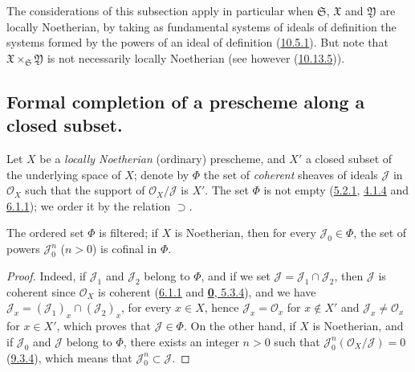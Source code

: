 \begin{env}[10.7.4]
The considerations of this subsection apply in particular when
$\mathfrak{S}$, $\mathfrak{X}$ and $\mathfrak{Y}$ are locally
Noetherian, by taking as fundamental systems of ideals of definition
the systems formed by the powers of an ideal of definition
(\hyperref[I.10.5.1]{10.5.1}). But note that
$\mathfrak{X}\times_{\mathfrak{S}}\mathfrak{Y}$ is not necessarily
locally Noetherian (see however
(\hyperref[I.10.13.5]{10.13.5})).
\end{env}


\subsection{Formal completion of a prescheme along a closed subset.}
\label{subsection:I.10.8}

\begin{env}[10.8.1]
\label{I.10.8.1}
Let $X$ be a \emph{locally Noetherian} (ordinary) prescheme, and $X'$ a closed
subset of the underlying space of $X$; denote by $\Phi$ the set of
\emph{coherent} sheaves of ideals $\mathscr{J}$ in $\mathscr{O}_X$ such that
the support of $\mathscr{O}_X/\mathscr{J}$ is $X'$. The set $\Phi$
is not empty (\hyperref[I.5.2.1]{5.2.1},
\hyperref[I.4.1.4]{4.1.4} and
\hyperref[I.6.1.1]{6.1.1}); we order it by the relation
$\supset$.
\end{env}

\begin{lemma}[10.8.2]
\label{I.10.8.2}
The ordered set $\Phi$ is filtered; if $X$ is Noetherian, then for every
$\mathscr{J}_0\in\Phi$, the set of powers
$\mathscr{J}_0^n$ ($n>0$) is cofinal in $\Phi$.
\end{lemma}

\begin{proof}
Indeed, if $\mathscr{J}_1$ and $\mathscr{J}_2$ belong to $\Phi$, and
if we set $\mathscr{J}=\mathscr{J}_1\cap\mathscr{J}_2$, then
$\mathscr{J}$ is coherent since $\mathscr{O}_X$ is coherent
(\hyperref[I.6.1.1]{6.1.1} and
\hyperref[0.5.3.4]{\textbf{0}, 5.3.4}), and we have
$\mathscr{J}_x=(\mathscr{J}_1)_x\cap(\mathscr{J}_2)_x$, for every
$x\in X$, hence $\mathscr{J}_x=\mathscr{O}_x$ for $x\notin X'$ and
$\mathscr{J}_x\neq\mathscr{O}_x$ for $x\in X'$, which proves that
$\mathscr{J}\in\Phi$. On the other hand, if $X$ is Noetherian, and if
$\mathscr{J}_0$ and $\mathscr{J}$ belong to $\Phi$, there exists an
integer $n>0$ such that
$\mathscr{J}_0^n(\mathscr{O}_X/\mathscr{J})=0$
(\hyperref[I.9.3.4]{9.3.4}), which means that
$\mathscr{J}_0^n\subset\mathscr{J}$.
\end{proof}

